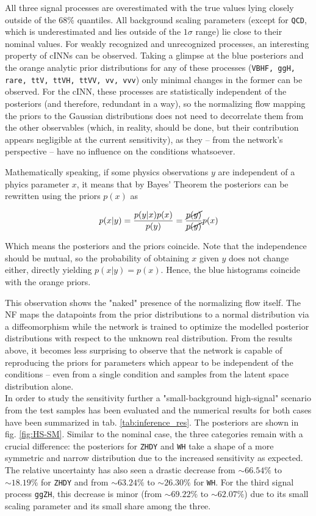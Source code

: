 All three signal processes are overestimated with the true values lying closely outside of the 68\% quantiles. All background scaling parameters (except for \texttt{QCD}, which is underestimated and lies outside of the $1\sigma$ range) lie close to their nominal values.
For weakly recognized and unrecognized processes, an interesting property of cINNs can be observed. Taking a glimpse at the blue posteriors and the orange analytic prior distributions for any of these processes (\texttt{VBHF, ggH, rare, ttV, ttVH, ttVV, vv, vvv}) only minimal changes in the former can be observed. For the cINN, these processes are statistically independent of the posteriors (and therefore, redundant in a way), so the normalizing flow mapping the priors to the Gaussian distributions does not need to decorrelate them from the other observables (which, in reality, should be done, but their contribution appears negligible at the current sensitivity), as they -- from the network's perspective -- have no influence on the conditions whatsoever.

Mathematically speaking, if some physics observations $y$ are independent of a phyics parameter $x$, it means that by Bayes' Theorem the posteriors can be rewritten using the priors $p(x)$ as

\begin{equation*}
	p(x|y) = \frac{p(y|x)p(x)}{p(y)} = \frac{\cancel{p(y)}}{\cancel{p(y)}} p(x)
\end{equation*}

Which means the posteriors and the priors coincide. Note that the independence should be mutual, so the probability of obtaining $x$ given $y$ does not change either, directly yielding $p(x|y) = p(x)$. Hence, the blue histograms coincide with the orange priors.

This observation shows the "naked" presence of the normalizing flow itself. The NF maps the datapoints from the prior distributions to a normal distribution via a diffeomorphism while the network is trained to optimize the modelled posterior distributions with respect to the unknown real distribution. From the results above, it becomes less surprising to observe that the network is capable of reproducing the priors for parameters which appear to be independent of the conditions -- even from a single condition and samples from the latent space distribution alone.\\

In order to study the sensitivity further a "small-background high-signal" scenario from the test samples has been evaluated and the numerical results for both cases have been summarized in tab. \ref{tab:inference_res}. The posteriors are shown in fig. \ref{fig:HS-SM}. Similar to the nominal case, the three categories remain with a crucial difference: the posteriors for \texttt{ZHDY} and \texttt{WH} take a shape of a more symmetric and narrow distribution due to the increased sensitivity as expected. The relative uncertainty has also seen a drastic decrease from $\sim66.54\%$ to $\sim18.19\%$ for \texttt{ZHDY} and from $\sim63.24\%$ to $\sim26.30\%$ for \texttt{WH}. For the third signal process \texttt{ggZH}, this decrease is minor (from $\sim69.22\%$ to $\sim 62.07\%$) due to its small scaling parameter and its small share among the three.

